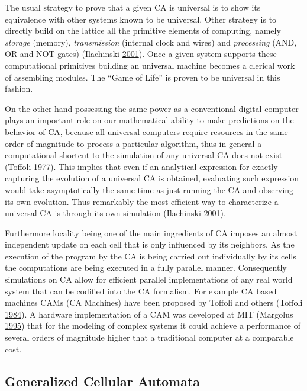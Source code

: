 \documentclass[
]{book}
\begin{document}
The usual strategy to prove that a given CA is universal is to show its equivalence with other systems known to be universal. Other strategy is to directly build on the lattice all the primitive elements of computing, namely \emph{storage} (memory), \emph{transmission} (internal clock and wires) and \emph{processing} (AND, OR and NOT gates) (Ilachinski \protect\hyperlink{ref-ilachinski2001cellular}{2001}). Once a given system supports these computational primitives building an universal machine becomes a clerical work of assembling modules. The ``Game of Life'' is proven to be universal in this fashion.

On the other hand possessing the same power as a conventional digital computer plays an important role on our mathematical ability to make predictions on the behavior of CA, because all universal computers require resources in the same order of magnitude to process a particular algorithm, thus in general a computational shortcut to the simulation of any universal CA does not exist (Toffoli \protect\hyperlink{ref-toffoli1977cellular}{1977}). This implies that even if an analytical expression for exactly capturing the evolution of a universal CA is obtained, evaluating such expression would take asymptotically the same time as just running the CA and observing its own evolution. Thus remarkably the most efficient way to characterize a universal CA is through its own simulation (Ilachinski \protect\hyperlink{ref-ilachinski2001cellular}{2001}).

Furthermore locality being one of the main ingredients of CA imposes an almost independent update on each cell that is only influenced by its neighbors. As the execution of the program by the CA is being carried out individually by its cells the computations are being executed in a fully parallel manner. Consequently simulations on CA allow for efficient parallel implementations of any real world system that can be codified into the CA formalism. For example CA based machines CAMs (CA Machines) have been proposed by Toffoli and others (Toffoli \protect\hyperlink{ref-toffoli1984cam}{1984}). A hardware implementation of a CAM was developed at MIT (Margolus \protect\hyperlink{ref-margolus1995cam}{1995}) that for the modeling of complex systems it could achieve a performance of several orders of magnitude higher that a traditional computer at a comparable cost.

\hypertarget{generalized-cellular-automata}{%
\subsection{Generalized Cellular Automata}\label{generalized-cellular-automata}}
\end{document}
